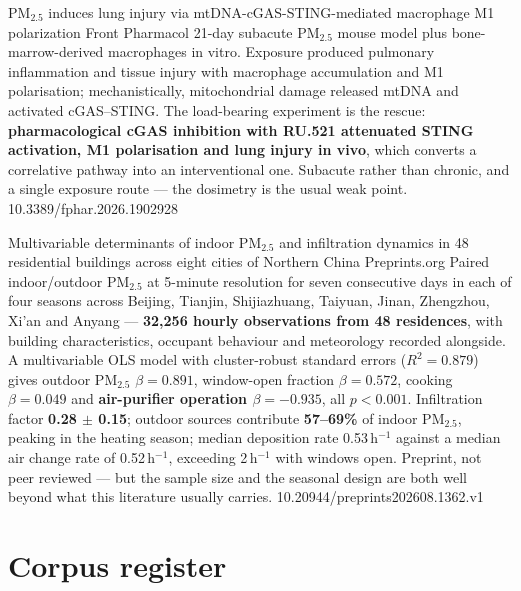 \documentclass[10pt]{article}
\begin{document}

{PM$_{2.5}$ induces lung injury via mtDNA-cGAS-STING-mediated macrophage M1 polarization}
{Front Pharmacol}
{21-day subacute PM$_{2.5}$ mouse model plus bone-marrow-derived macrophages in vitro.
Exposure produced pulmonary inflammation and tissue injury with macrophage accumulation
and M1 polarisation; mechanistically, mitochondrial damage released mtDNA and activated
cGAS--STING. The load-bearing experiment is the rescue: \textbf{pharmacological cGAS
inhibition with RU.521 attenuated STING activation, M1 polarisation and lung injury in
vivo}, which converts a correlative pathway into an interventional one. Subacute rather
than chronic, and a single exposure route --- the dosimetry is the usual weak point.}
{10.3389/fphar.2026.1902928}


{Multivariable determinants of indoor PM$_{2.5}$ and infiltration dynamics in 48 residential buildings across eight cities of Northern China}
{Preprints.org}
{Paired indoor/outdoor PM$_{2.5}$ at 5-minute resolution for seven consecutive days in
each of four seasons across Beijing, Tianjin, Shijiazhuang, Taiyuan, Jinan, Zhengzhou,
Xi'an and Anyang --- \textbf{32{,}256 hourly observations from 48 residences}, with
building characteristics, occupant behaviour and meteorology recorded alongside. A
multivariable OLS model with cluster-robust standard errors ($R^2 = 0.879$) gives
outdoor PM$_{2.5}$ $\beta = 0.891$, window-open fraction $\beta = 0.572$, cooking
$\beta = 0.049$ and \textbf{air-purifier operation $\beta = -0.935$}, all $p < 0.001$.
Infiltration factor \textbf{0.28 $\pm$ 0.15}; outdoor sources contribute
\textbf{57--69\%} of indoor PM$_{2.5}$, peaking in the heating season; median deposition
rate 0.53\,h$^{-1}$ against a median air change rate of 0.52\,h$^{-1}$, exceeding
2\,h$^{-1}$ with windows open. Preprint, not peer reviewed --- but the sample size and
the seasonal design are both well beyond what this literature usually carries.}
{10.20944/preprints202608.1362.v1}

\vspace{4mm}
\section*{\sffamily\bfseries\color{Deep}Corpus register}
\vspace{-1.5mm}{\color{Amber}\rule{\linewidth}{1.1pt}}\vspace{2.5mm}
\end{document}

